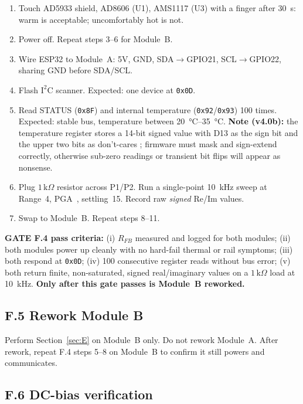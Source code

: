 \documentclass[11pt,a4paper]{article}
\newcommand{\kohm}[1]{\ensuremath{#1\,\mathrm{k}\Omega}}
\begin{document}
\begin{enumerate}
\item Touch AD5933 shield, AD8606 (U1), AMS1117 (U3) with a finger after \SI{30}{\second}: warm is acceptable; uncomfortably hot is not.
\item Power off. Repeat steps 3--6 for Module~B.
\item Wire ESP32 to Module~A: 5V, GND, SDA$\to$GPIO21, SCL$\to$GPIO22, sharing GND before SDA/SCL.
\item Flash $\mathrm{I^2C}$ scanner. Expected: one device at \texttt{0x0D}.
\item Read STATUS (\texttt{0x8F}) and internal temperature (\texttt{0x92}/\texttt{0x93}) 100 times. Expected: stable bus, temperature between \SIrange{20}{35}{\celsius}. \textbf{Note (v4.0b):} the temperature register stores a 14-bit signed value with D13 as the sign bit and the upper two bits as don't-cares \cite{ad5933ds}; firmware must mask and sign-extend correctly, otherwise sub-zero readings or transient bit flips will appear as nonsense.
\item Plug \kohm{1} resistor across P1/P2. Run a single-point \SI{10}{\kilo\hertz} sweep at Range~4, PGA~, settling~15. Record raw \emph{signed} Re/Im values.
\item Swap to Module~B. Repeat steps 8--11.
\end{enumerate}

\begin{gatebox}
\textbf{GATE F.4 pass criteria:} (i) $R_{FB}$ measured and logged for both modules; (ii) both modules power up cleanly with no hard-fail thermal or rail symptoms; (iii) both respond at \texttt{0x0D}; (iv) 100 consecutive register reads without bus error; (v) both return finite, non-saturated, signed real/imaginary values on a \kohm{1} load at \SI{10}{\kilo\hertz}. \textbf{Only after this gate passes is Module~B reworked.}
\end{gatebox}

\subsection{F.5 Rework Module B}

Perform Section~\ref{sec:E} on Module~B only. Do not rework Module~A. After rework, repeat F.4 steps 5--8 on Module~B to confirm it still powers and communicates.

\subsection{F.6 DC-bias verification}
\end{document}
